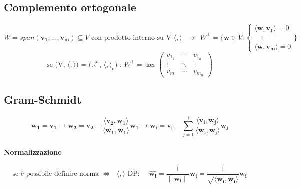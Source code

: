 \documentclass[10pt]{article}
\theoremstyle{plain}
\begin{document}
\subsection*{Complemento ortogonale}
\[W = span(\mathbf{v_1}, ..., \mathbf{v_m}) \subseteq V \textrm{ con prodotto interno su V $\langle,\rangle$} \enspace \rightarrow \enspace W^{\perp} = \{\mathbf{w} \in V : \begin{cases}
    \langle \mathbf{w}, \mathbf{v_1} \rangle = 0\\
    \quad \vdots\\
    \langle \mathbf{w}, \mathbf{v_m} \rangle = 0
\end{cases}\}\]
\[\textrm{se (V, $\langle,\rangle$) = ($\mathbb{R}^n$, $\langle, \rangle_e$) : } W^{\perp} = \ker \begin{pmatrix}
    v_{1_1} & \cdots & v_{1_n}\\
    \vdots & \ddots & \vdots\\
    v_{m_1} & \cdots & v_{m_n}
\end{pmatrix}\]

\subsection*{Gram-Schmidt}
\[\mathbf{w_1} = \mathbf{v_1} \rightarrow \mathbf{w_2} = \mathbf{v_2} - \frac{\langle \mathbf{v_2}, \mathbf{w_1} \rangle}{\langle \mathbf{w_1}, \mathbf{w_1} \rangle} \mathbf{w_1} \rightarrow \mathbf{w_i} = \mathbf{v_i} - \sum \limits_{j = 1}^{i} \frac{\langle \mathbf{v_i}, \mathbf{w_j} \rangle}{\langle \mathbf{w_j}, \mathbf{w_j} \rangle} \mathbf{w_j}\]
\paragraph{Normalizzazione}
\[\textrm{se è possibile definire norma $\Leftrightarrow$ $\langle, \rangle$ DP: } \quad \hat{\mathbf{w_i}} = \frac{1}{\lVert \mathbf{w_i}\rVert} \mathbf{w_i} = \frac{1}{\sqrt{\langle\mathbf{w_i}, \mathbf{w_i} \rangle}} \mathbf{w_i}\]
\end{document}
